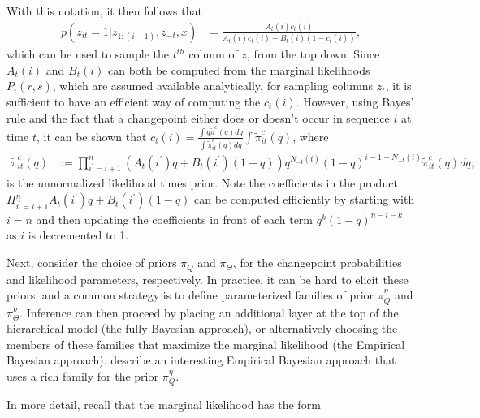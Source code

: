 \documentclass{article}
\begin{document}
With this notation, it then follows that
\begin{align*}
  p\left(z_{it} = 1 \vert z_{1:(i - 1)}, z_{-t}, x\right) &= \frac{A_{t}\left(i\right)c_{t}\left(i\right)}{A_{t}\left(i\right)c_t\left(i\right) + B_t\left(i\right)\left(1 - c_t\left(i\right)\right)},
\end{align*}
which can be used to sample the $t^{th}$ column of $z$, from the top down. Since
$A_{t}\left(i\right)$ and $B_{t}\left(i\right)$ can both be computed from the
marginal likelihoods $P_{i}\left(r, s\right)$, which are assumed available
analytically, for sampling columns $z_t$, it is sufficient to have an efficient
way of computing the $c_{t}\left(i\right)$. However, using Bayes' rule and the
fact that a changepoint either does or doesn't occur in sequence $i$ at time
$t$, it can be shown that $c_{t}\left(i\right) = \frac{\int q
  \tilde{\pi}^{c}\left(q\right) dq}{\int \tilde{\pi}_{it}^{c}\left(q\right)
  dq}{\int \tilde{\pi}_{it}^{c}\left(q\right)}$, where
\begin{align*}
  \tilde{\pi}_{it}^{c}\left(q\right) &:= \prod_{i^\prime = i + 1}^{n} \left(A_{t}\left(i^\prime\right)q + B_{t}\left(i^\prime\right)\left(1 - q\right)\right)q^{N_{-t}\left(i\right)}\left(1 - q\right)^{i - 1 - N_{-t}\left(i\right)} \tilde{\pi}_{it}^{c}\left(q\right) dq,
\end{align*}
is the unnormalized likelihood times prior. Note the coefficients in the product
$\Pi_{i^\prime = i + 1}^{n} A_{t}\left(i^\prime\right)q +
B_{t}\left(i^\prime\right)\left(1 - q\right)$ can be computed efficiently by
starting with $i = n$ and then updating the coefficients in front of each term
$q^k \left(1 - q\right)^{n - i - k}$ as $i$ is decremented to 1.

Next, consider the choice of priors $\pi_{Q}$ and $\pi_{\Theta}$, for the
changepoint probabilities and likelihood parameters, respectively. In practice,
it can be hard to elicit these priors, and a common strategy is to define
parameterized families of prior $\pi_{Q}^{\eta}$ and $\pi_{\Theta}^{\nu}$.
Inference can then proceed by placing an additional layer at the top of the
hierarchical model (the fully Bayesian approach), or alternatively choosing the
members of these families that maximize the marginal likelihood (the Empirical
Bayesian approach). \citep{fan2015empirical} describe an interesting Empirical
Bayesian approach that uses a rich family for the prior $\pi_{Q}^{\eta}$.

In more detail, recall that the marginal likelihood has the form
\begin{align}
 \label{eq:pi_q_marginal_lik} 
\end{align}
\end{document}
